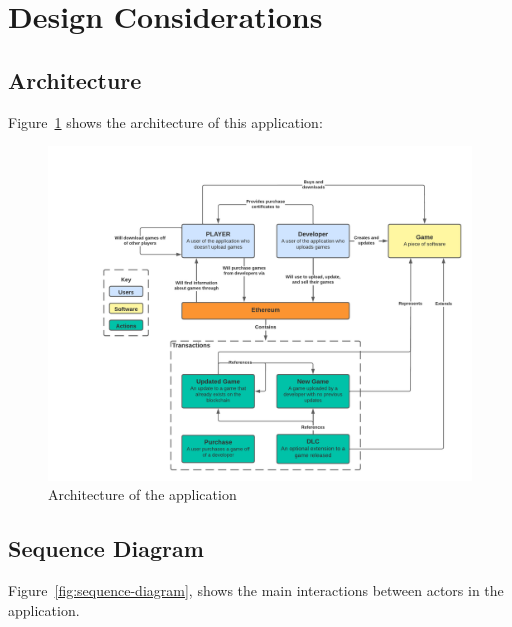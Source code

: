 \newpage
\section{Design Considerations}

\subsection*{Architecture}

Figure~\ref{fig:architecture-diagram} shows the architecture of this application:

\begin{figure}[ht]
  \centering
  \includegraphics*[width=\textwidth]{assets/images/diagrams/architecture-diagram.png}
  \caption{Architecture of the application}
  \label{fig:architecture-diagram}
\end{figure}

\subsection*{Sequence Diagram}

Figure~\ref{fig:sequence-diagram}, shows the main interactions between actors in the application.

